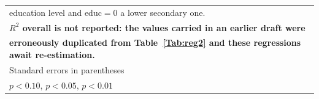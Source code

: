 \begin{table}[htbp]
\begin{tabular}{l*{4}{c}}
\multicolumn{5}{l}{\footnotesize education level and educ\(=0\) a lower secondary one.}\\
\multicolumn{5}{l}{\footnotesize \textbf{\(R^2\) overall is not reported: the values carried in an earlier draft were}}\\
\multicolumn{5}{l}{\textbf{\footnotesize erroneously duplicated from Table~\ref{Tab:reg2} and these regressions await re-estimation.}}\\
\multicolumn{5}{l}{\footnotesize Standard errors in parentheses}\\
\multicolumn{5}{l}{\footnotesize \sym{*} \(p<0.10\), \sym{**} \(p<0.05\), \sym{***} \(p<0.01\)}\\
\end{tabular}
\end{table}
